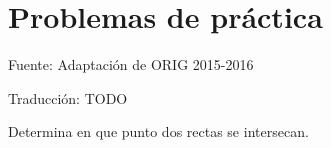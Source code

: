 \section*{Problemas de práctica}

\begin{exercise}
\end{exercise}

\begin{exercise}
	Fuente: Adaptación de ORIG 2015-2016
\end{exercise}

\begin{exercise}
	Traducción: TODO
\end{exercise}

\begin{exercise}
\end{exercise}

\begin{exercise}
\end{exercise}

\begin{exercise}
\end{exercise}

\begin{exercise}
\end{exercise}

\begin{exercise}
\end{exercise}

\begin{exercise}
\end{exercise}

\begin{exercise}
	Determina en que punto dos rectas se intersecan.
\end{exercise}